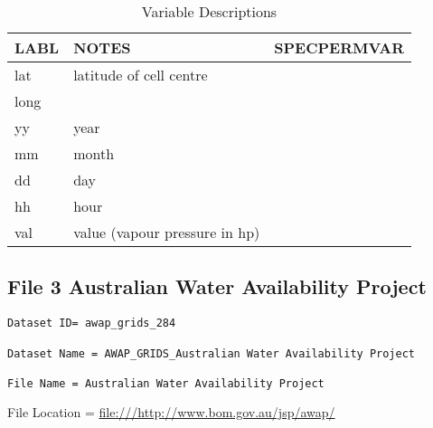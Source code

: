 \documentclass[a4paper]{article}
\begin{document}
\begin{table}[ht]
\begin{center}
\caption{Variable Descriptions}
\label{tab:tabx}
\begin{tabular}{p{3cm}p{5cm}p{5cm}}
  \hline
LABL & NOTES & SPECPERMVAR \\ 
  \hline
lat & latitude of cell centre &  \\ 
  long &  &  \\ 
  yy & year &  \\ 
  mm & month &  \\ 
  dd & day &  \\ 
  hh & hour &  \\ 
  val & value (vapour pressure in hp) &  \\ 
   \hline
\end{tabular}
\end{center}
\end{table}\clearpage
\subsection{File 3 Australian Water Availability Project}

\begin{verbatim}
Dataset ID= awap_grids_284

Dataset Name = AWAP_GRIDS_Australian Water Availability Project

File Name = Australian Water Availability Project
\end{verbatim}

\noindent File Location = \url{file:///http://www.bom.gov.au/jsp/awap/}




 
\end{document}
